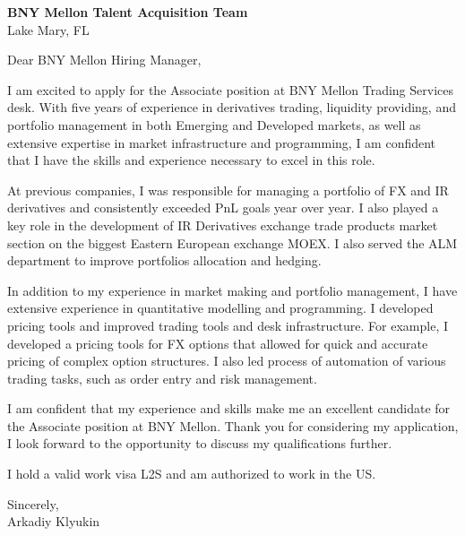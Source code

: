 \documentclass{letter}
\begin{document}
\begin{letter}{\textbf{BNY Mellon Talent Acquisition Team} \\
                Lake Mary, FL}


\opening{Dear BNY Mellon Hiring Manager,}

I am excited to apply for the Associate position at BNY Mellon Trading Services desk. With five years of experience in derivatives trading, liquidity providing, and portfolio management in both Emerging and Developed markets, as well as extensive expertise in market infrastructure and programming, I am confident that I have the skills and experience necessary to excel in this role.

At previous companies, I was responsible for managing a portfolio of FX and IR derivatives and consistently exceeded PnL goals year over year. I also played a key role in the development of IR Derivatives exchange trade products market section on the biggest Eastern European exchange MOEX. I also served the ALM department to improve portfolios allocation and hedging.

In addition to my experience in market making and portfolio management, I have extensive experience in quantitative modelling and programming. I developed pricing tools and improved trading tools and desk infrastructure. For example, I developed a pricing tools for FX options that allowed for quick and accurate pricing of complex option structures. I also led process of automation of various trading tasks, such as order entry and risk management.

I am confident that my experience and skills make me an excellent candidate for the Associate position at BNY Mellon. Thank you for considering my application, I look forward to the opportunity to discuss my qualifications further.

I hold a valid work visa L2S and am authorized to work in the US.

Sincerely,\\
Arkadiy Klyukin
\end{letter}
\end{document}
